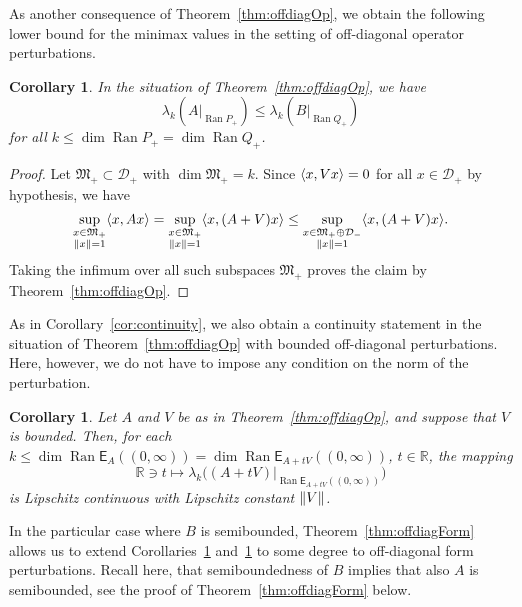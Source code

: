\documentclass[11pt,a4paper]{amsart}
\numberwithin{equation}{section}
\DeclareMathOperator{\Ran}{Ran}
\DeclarePairedDelimiter{\norm}{\lVert}{\rVert}
\DeclarePairedDelimiter{\scprod}{\langle}{\rangle}
\newcommand{\RR}{\mathbb{R}}
\newcommand{\EE}{\mathsf{E}}
\newcommand{\cD}{{\mathcal D}}
\newcommand{\fM}{{\mathfrak M}}
\theoremstyle{plain}
\newtheorem{corollary}[theorem]{Corollary}
\theoremstyle{definition}
\theoremstyle{remark}
\begin{document}
As another consequence of Theorem~\ref{thm:offdiagOp}, we obtain the following lower bound for the minimax values in the setting
of off-diagonal operator perturbations.
\begin{corollary}\label{cor:lowerboundOffOp}
  In the situation of Theorem~\ref{thm:offdiagOp}, we have
  \begin{equation*}
    \lambda_k(A|_{\Ran P_+})
    \le
    \lambda_k(B|_{\Ran Q_+})
  \end{equation*}
  for all $k \le \dim\Ran P_+ = \dim \Ran Q_+$.
\end{corollary}

\begin{proof}
  Let $\fM_+ \subset \cD_+$ with $\dim\fM_+ = k$. Since $\scprod{ x , Vx } = 0$ for all $x \in \cD_+$ by hypothesis, we have
  \begin{equation*}
    \sup_{\substack{x \in \fM_+\\ \norm{x}=1}} \scprod{ x , Ax }
    =
    \sup_{\substack{x \in \fM_+\\ \norm{x}=1}} \scprod{ x , (A+V)x }
    \le
    \sup_{\substack{x \in \fM_+ \oplus \cD_-\\ \norm{x}=1}} \scprod{ x , (A+V)x }
    .
  \end{equation*}
  Taking the infimum over all such subspaces $\fM_+$ proves the claim by Theorem~\ref{thm:offdiagOp}.
\end{proof}%

As in Corollary~\ref{cor:continuity}, we also obtain a continuity statement in the situation of Theorem~\ref{thm:offdiagOp} with
bounded off-diagonal perturbations. Here, however, we do not have to impose any condition on the norm of the perturbation.

\begin{corollary}\label{cor:continuityOffOp}
  Let $A$ and $V$ be as in Theorem~\ref{thm:offdiagOp}, and suppose that $V$ is bounded. Then, for each
  $k \le \dim \Ran\EE_A((0,\infty)) = \dim \Ran\EE_{A+tV}((0,\infty))$, $t \in \RR$, the mapping
  \begin{equation*}
    \RR
    \ni
    t
    \mapsto
    \lambda_k\bigl( (A+tV)|_{\Ran\EE_{A+tV}((0,\infty))} \bigr)
  \end{equation*}
  is Lipschitz continuous with Lipschitz constant $\norm{V}$.
\end{corollary}

In the particular case where $B$ is semibounded, Theorem~\ref{thm:offdiagForm} allows us to extend
Corollaries~\ref{cor:lowerboundOffOp} and~\ref{cor:continuityOffOp} to some degree to off-diagonal form perturbations. Recall
here, that semiboundedness of $B$ implies that also $A$ is semibounded, see the proof of Theorem~\ref{thm:offdiagForm} below.
\end{document}
